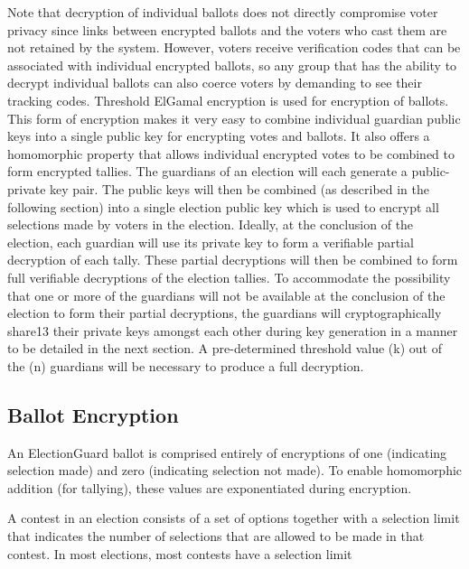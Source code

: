 Note that decryption of individual ballots does not directly compromise voter privacy since links between encrypted
ballots and the voters who cast them are not retained by the system. However, voters receive verification codes that can
be associated with individual encrypted ballots, so any group that has the ability to decrypt individual ballots can
also coerce voters by demanding to see their tracking codes. Threshold ElGamal encryption is used for encryption of
ballots. This form of encryption makes it very easy to combine individual guardian public keys into a single public key
for encrypting votes and ballots. It also offers a homomorphic property that allows individual encrypted votes to be
combined to form encrypted tallies. The guardians of an election will each generate a public-private key pair. The
public keys will then be combined (as described in the following section) into a single election public key which is
used to encrypt all selections made by voters in the election. Ideally, at the conclusion of the election, each guardian
will use its private key to form a verifiable partial decryption of each tally. These partial decryptions will then be
combined to form full verifiable decryptions of the election tallies. To accommodate the possibility that one or more of
the guardians will not be available at the conclusion of the election to form their partial decryptions, the guardians
will cryptographically share13 their private keys amongst each other during key generation in a manner to be detailed in
the next section. A pre-determined threshold value (k) out of the (n) guardians will be necessary to produce a full
decryption.
\cite[8]{eg-spec}

\subsection{Ballot Encryption}
An ElectionGuard ballot is comprised entirely of encryptions of one (indicating selection made) and zero (indicating
selection not made). To enable homomorphic addition (for tallying), these values are exponentiated during encryption.
\cite[12]{eg-spec}

A contest in an election consists of a set of options together with a selection limit that indicates the number of
selections that are allowed to be made in that contest. In most elections, most contests have a selection limit
\cite[12]{eg-spec}

